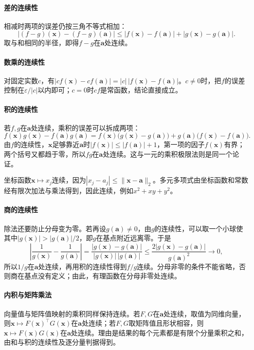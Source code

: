 \paragraph{差的连续性}
相减时两项的误差仍按三角不等式相加：
\[
 |(f-g)(\bm x)-(f-g)(\bm a)|\leq|f(\bm x)-f(\bm a)|+|g(\bm x)-g(\bm a)|.
\]
取与和相同的半径，即得$f-g$在$\bm a$处连续。

\paragraph{数乘的连续性}
对固定实数$c$，有$|cf(\bm x)-cf(\bm a)|=|c|\,|f(\bm x)-f(\bm a)|$。$c\neq0$时，把$f$的误差控制在$\varepsilon/|c|$以内即可；$c=0$时$cf$是常函数，结论直接成立。

\paragraph{积的连续性}
若$f,g$在$\bm a$处连续，乘积的误差可以拆成两项：
\[
 f(\bm x)g(\bm x)-f(\bm a)g(\bm a)
 =f(\bm x)\bigl(g(\bm x)-g(\bm a)\bigr)+g(\bm a)\bigl(f(\bm x)-f(\bm a)\bigr).
\]
由$f$的连续性，$\bm x$足够靠近$\bm a$时$|f(\bm x)|\leq|f(\bm a)|+1$，第一项的因子$f(\bm x)$有界；两个括号又都趋于零，所以$fg$在$\bm a$处连续。这与一元的乘积极限法则是同一个论证。

坐标函数$\bm x\mapsto x_j$连续，因为$|x_j-a_j|\leq\lVert\bm x-\bm a\rVert_2$。多元多项式由坐标函数和常数经有限次加法与乘法得到，因此连续，例如$x^2+xy+y^2$。

\paragraph{商的连续性}
除法还要防止分母变为零。若再设$g(\bm a)\neq0$，由$g$的连续性，可以取一个小球使其中$|g(\bm x)|>|g(\bm a)|/2$，即$g$在基点附近远离零。于是
\[
 \left|\frac1{g(\bm x)}-\frac1{g(\bm a)}\right|
 =\frac{|g(\bm x)-g(\bm a)|}{|g(\bm x)|\,|g(\bm a)|}
 \leq\frac{2|g(\bm x)-g(\bm a)|}{g(\bm a)^2}\longrightarrow0,
\]
所以$1/g$在$\bm a$处连续，再用积的连续性得到$f/g$连续。分母非零的条件不能省略，否则商在基点没有定义；由此，有理函数在分母非零处连续。

\paragraph{内积与矩阵乘法}
向量值与矩阵值映射的乘积同样保持连续。若$F,G$在$\bm a$处连续，取值为同维向量，则$\bm x\mapsto F(\bm x)^\top G(\bm x)$在$\bm a$处连续；若$F,G$取矩阵值且形状相容，则$\bm x\mapsto F(\bm x)G(\bm x)$在$\bm a$处连续。理由是结果的每个元素都是有限个分量乘积之和，由和与积的连续性及逐分量判据得到。

